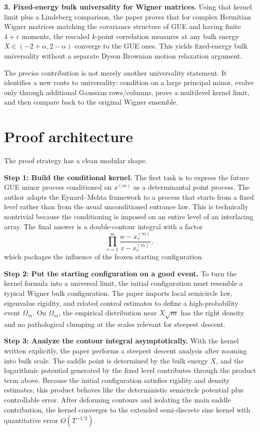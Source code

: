 \documentclass[11pt]{article}
\begin{document}
\textbf{3. Fixed-energy bulk universality for Wigner matrices.} Using that kernel limit plus a Lindeberg comparison, the paper proves that for complex Hermitian Wigner matrices matching the covariance structure of GUE and having finite $4+\varepsilon$ moments, the rescaled $k$-point correlation measures at any bulk energy $X\in(-2+\alpha,2-\alpha)$ converge to the GUE ones. This yields fixed-energy bulk universality without a separate Dyson Brownian motion relaxation argument.

The precise contribution is not merely another universality statement. It identifies a new route to universality: condition on a large principal minor, evolve only through additional Gaussian rows/columns, prove a multilevel kernel limit, and then compare back to the original Wigner ensemble.

\section*{Proof architecture}
The proof strategy has a clean modular shape.

\textbf{Step 1: Build the conditional kernel.}
The first task is to express the future GUE minor process conditioned on $x^{(m)}$ as a determinantal point process. The author adapts the Eynard--Mehta framework to a process that starts from a fixed level rather than from the usual unconditioned entrance law. This is technically nontrivial because the conditioning is imposed on an entire level of an interlacing array. The final answer is a double-contour integral with a factor
\[
\prod_{r=1}^m \frac{w-x^{(m)}_r}{z-x^{(m)}_r},
\]
which packages the influence of the frozen starting configuration.

\textbf{Step 2: Put the starting configuration on a good event.}
To turn the kernel formula into a universal limit, the initial configuration must resemble a typical Wigner bulk configuration. The paper imports local semicircle law, eigenvalue rigidity, and related control estimates to define a high-probability event $\Omega_m$. On $\Omega_m$, the empirical distribution near $X\sqrt m$ has the right density and no pathological clumping at the scales relevant for steepest descent.

\textbf{Step 3: Analyze the contour integral asymptotically.}
With the kernel written explicitly, the paper performs a steepest descent analysis after zooming into bulk scale. The saddle point is determined by the bulk energy $X$, and the logarithmic potential generated by the fixed level contributes through the product term above. Because the initial configuration satisfies rigidity and density estimates, this product behaves like the deterministic semicircle potential plus controllable error. After deforming contours and isolating the main saddle contribution, the kernel converges to the extended semi-discrete sine kernel with quantitative error $O(T^{-1/2})$.
\end{document}
